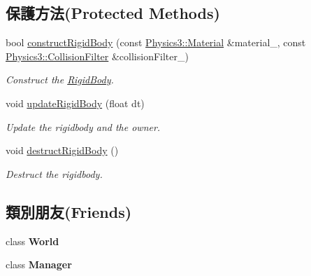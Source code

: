 \subsection*{保護方法(Protected Methods)}
\begin{DoxyCompactItemize}
\item 
bool \hyperlink{class_i_dream_sky_1_1_physics3_1_1_vehicle_adaf45020b377932849cf5f991011a7be}{construct\+Rigid\+Body} (const \hyperlink{class_i_dream_sky_1_1_physics3_1_1_material}{Physics3\+::\+Material} \&material\+\_\+, const \hyperlink{class_i_dream_sky_1_1_physics3_1_1_collision_filter}{Physics3\+::\+Collision\+Filter} \&collision\+Filter\+\_\+)
\begin{DoxyCompactList}\small\item\em Construct the \hyperlink{class_i_dream_sky_1_1_physics3_1_1_rigid_body}{Rigid\+Body}. \end{DoxyCompactList}\item 
void \hyperlink{class_i_dream_sky_1_1_physics3_1_1_vehicle_a8bf438c58a7ec85a9d5e700c47dfaeb5}{update\+Rigid\+Body} (float dt)
\begin{DoxyCompactList}\small\item\em Update the rigidbody and the owner. \end{DoxyCompactList}\item 
void \hyperlink{class_i_dream_sky_1_1_physics3_1_1_vehicle_a2f17e197c9754f87be7d71aca79388dd}{destruct\+Rigid\+Body} ()\hypertarget{class_i_dream_sky_1_1_physics3_1_1_vehicle_a2f17e197c9754f87be7d71aca79388dd}{}\label{class_i_dream_sky_1_1_physics3_1_1_vehicle_a2f17e197c9754f87be7d71aca79388dd}

\begin{DoxyCompactList}\small\item\em Destruct the rigidbody. \end{DoxyCompactList}\end{DoxyCompactItemize}
\subsection*{類別朋友(Friends)}
\begin{DoxyCompactItemize}
\item 
class {\bfseries World}\hypertarget{class_i_dream_sky_1_1_physics3_1_1_vehicle_a7b4bcdf992c21ae83363f25df05b1d25}{}\label{class_i_dream_sky_1_1_physics3_1_1_vehicle_a7b4bcdf992c21ae83363f25df05b1d25}

\item 
class {\bfseries Manager}\hypertarget{class_i_dream_sky_1_1_physics3_1_1_vehicle_adddd5c43ff870a047aa66db4edf82a7e}{}\label{class_i_dream_sky_1_1_physics3_1_1_vehicle_adddd5c43ff870a047aa66db4edf82a7e}

\end{DoxyCompactItemize}



